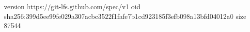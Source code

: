 version https://git-lfs.github.com/spec/v1
oid sha256:399d5ee99fe029a307acbc3522f1fafe7b1cd923185f3efb098a13bfd04012a0
size 87544
